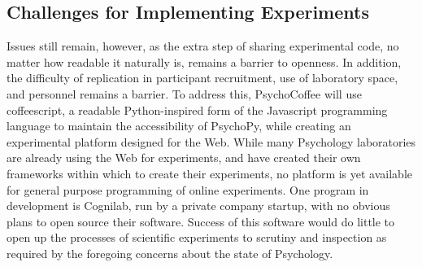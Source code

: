 \documentclass[12pt,a4paper,titlepage]{scrreprt}
\begin{document}
\subsection{Challenges for Implementing Experiments}
Issues still remain, however, as the extra step of sharing experimental code, no matter how readable it naturally is, remains a barrier to openness. In addition, the difficulty of replication in participant recruitment, use of laboratory space, and personnel remains a barrier. To address this, PsychoCoffee will use coffeescript, a readable Python-inspired form of the Javascript programming language to maintain the accessibility of PsychoPy, while creating an experimental platform designed for the Web.
While many Psychology laboratories are already using the Web for experiments, and have created their own frameworks within which to create their experiments\cite{krantz_comparing_1997,germine_is_2012}, no platform is yet available for general purpose programming of online experiments. One program in development is Cognilab\cite{_cognilab_????}, run by a private company startup, with no obvious plans to open source their software. Success of this software would do little to open up the processes of scientific experiments to scrutiny and inspection as required by the foregoing concerns about the state of Psychology.
\end{document}
